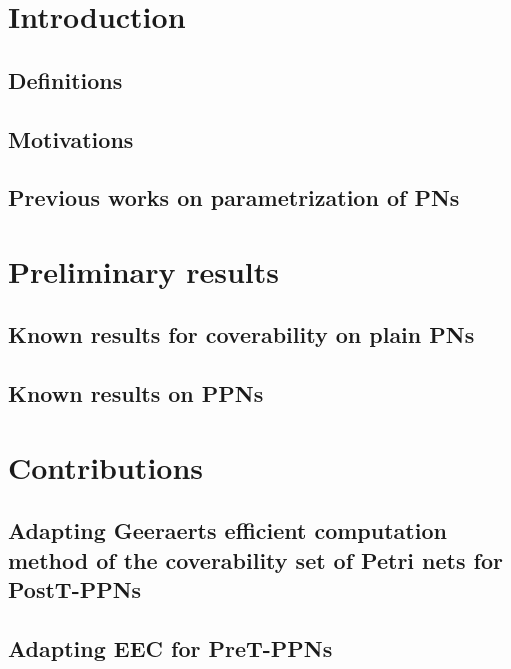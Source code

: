 \documentclass[11pt,a4paper,oneside]{book}
\theoremstyle{plain}
\theoremstyle{definition}
\theoremstyle{remark}
\begin{document}
\thispagestyle{empty} 
\setcounter{page}{0}
\tableofcontents
\acresetall

\mainmatter
\setcounter{page}{1}

\chapter{Introduction}

\section{Definitions}

\section{Motivations}


\section{Previous works on parametrization of \acp{PN}}


\chapter{Preliminary results}
\section{Known results for coverability on plain \acp{PN}}

\section{Known results on \acp{PPN}}


\chapter{Contributions}
\section{Adapting Geeraerts efficient computation method of the coverability set of Petri nets for PostT-\acp{PPN}}
\section{Adapting \ac{EEC} for PreT-\acp{PPN}}

\vspace*{0.5cm}
\end{document}
